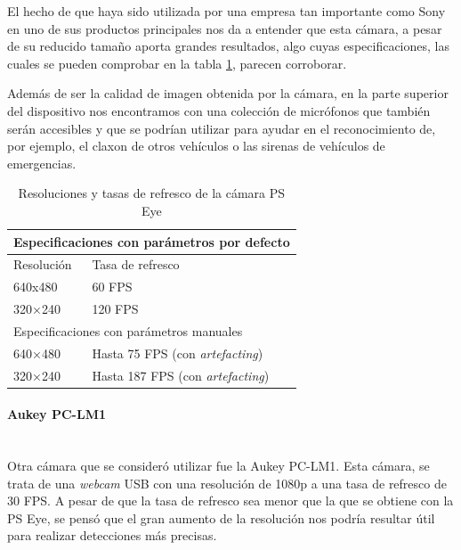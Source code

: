 El hecho de que haya sido utilizada por una empresa tan importante como Sony en uno de sus productos principales nos da a entender que esta cámara, a pesar de su reducido tamaño aporta grandes resultados, algo cuyas especificaciones, las cuales se pueden comprobar en la tabla \ref{tab:resFpsPSeye}, parecen corroborar.

Además de ser la calidad de imagen obtenida por la cámara, en la parte superior del dispositivo nos encontramos con una colección de micrófonos que también serán accesibles y que se podrían utilizar para ayudar en el reconocimiento de, por ejemplo, el claxon de otros vehículos o las sirenas de vehículos de emergencias.

\begin{table}[h!]
    \centering
    \begin{tabular}{@{}ll@{}}
    \toprule
    \multicolumn{2}{l}{Especificaciones con parámetros por defecto} \\ \midrule
    Resolución                  & Tasa de refresco                  \\
    640x480                     & 60 FPS                            \\
    320×240                     & 120 FPS                           \\ \midrule
    \multicolumn{2}{l}{Especificaciones con parámetros manuales}    \\ \midrule
    640×480                     & Hasta 75 FPS (con \textit{artefacting})                     \\
    320×240                     & Hasta 187 FPS (con \textit{artefacting})                     \\ \bottomrule
    \end{tabular}
    \caption{Resoluciones y tasas de refresco de la cámara PS Eye}
    \label{tab:resFpsPSeye}
    \end{table}

\paragraph{Aukey PC-LM1}\mbox{}\\

Otra cámara que se consideró utilizar fue la Aukey PC-LM1. Esta cámara, se trata de una \textit{webcam} USB con una resolución de 1080p a una tasa de refresco de 30 FPS. A pesar de que la tasa de refresco sea menor que la que se obtiene con la PS Eye, se pensó que el gran aumento de la resolución nos podría resultar útil para realizar detecciones más precisas.

